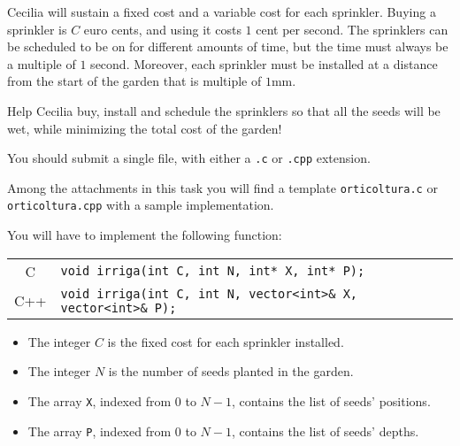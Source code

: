 Cecilia will sustain a fixed cost and a variable cost for each sprinkler. Buying
a sprinkler is $C$ euro cents, and using it costs $1$ cent per second. The
sprinklers can be scheduled to be on for different amounts of time, but the time
must always be a multiple of $1$ second. Moreover, each sprinkler must be
installed at a distance from the start of the garden that is multiple of $1$mm.

Help Cecilia buy, install and schedule the sprinklers so that all the seeds will
be wet, while minimizing the total cost of the garden!



\Implementation

You should submit a single file, with either a \texttt{.c} or \texttt{.cpp}
extension.

\begin{warning}
Among the attachments in this task you will find a template
\texttt{orticoltura.c} or \texttt{orticoltura.cpp} with a sample implementation.
\end{warning}

You will have to implement the following function:

\begin{center}\begin{tabularx}{\textwidth}{|c|X|}
\hline
C    & \verb|void irriga(int C, int N, int* X, int* P);|\\
C++  & \verb|void irriga(int C, int N, vector<int>& X, vector<int>& P);|\\
\hline
\end{tabularx}\end{center}

\begin{itemize}[nolistsep]
  \item The integer $C$ is the fixed cost for each sprinkler installed.
  \item The integer $N$ is the number of seeds planted in the garden.
  \item The array \texttt{X}, indexed from $0$ to $N-1$, contains the list of seeds' positions.
  \item The array \texttt{P}, indexed from $0$ to $N-1$, contains the list of seeds' depths.
\end{itemize}

\medskip

